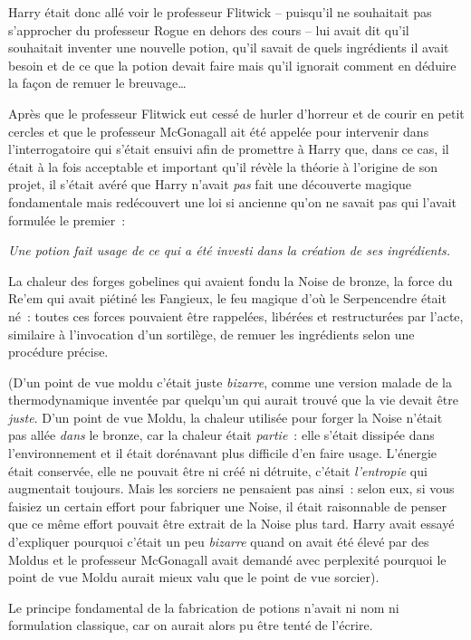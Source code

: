 Harry était donc allé voir le professeur Flitwick -- puisqu'il ne souhaitait pas s'approcher du professeur Rogue en dehors des cours -- lui avait dit qu'il souhaitait inventer une nouvelle potion, qu'il savait de quels ingrédients il avait besoin et de ce que la potion devait faire mais qu'il ignorait comment en déduire la façon de remuer le breuvage…

Après que le professeur Flitwick eut cessé de hurler d'horreur et de courir en petit cercles et que le professeur McGonagall ait été appelée pour intervenir dans l'interrogatoire qui s'était ensuivi afin de promettre à Harry que, dans ce cas, il était à la fois acceptable et important qu'il révèle la théorie à l'origine de son projet, il s'était avéré que Harry n'avait \emph{pas} fait une découverte magique fondamentale mais redécouvert une loi si ancienne qu'on ne savait pas qui l'avait formulée le premier~:

\emph{Une potion fait usage de ce qui a été investi dans la création de ses ingrédients.}

La chaleur des forges gobelines qui avaient fondu la Noise de bronze, la force du Re'em qui avait piétiné les Fangieux, le feu magique d'où le Serpencendre était né~: toutes ces forces pouvaient être rappelées, libérées et restructurées par l'acte, similaire à l'invocation d'un sortilège, de remuer les ingrédients selon une procédure précise.

(D'un point de vue moldu c'était juste \emph{bizarre}, comme une version malade de la thermodynamique inventée par quelqu'un qui aurait trouvé que la vie devait être \emph{juste}.
D'un point de vue Moldu, la chaleur utilisée pour forger la Noise n'était pas allée \emph{dans} le bronze, car la chaleur était \emph{partie}~: elle s'était dissipée dans l'environnement et il était dorénavant plus difficile d'en faire usage.
L'énergie était conservée, elle ne pouvait être ni créé ni détruite, c'était \emph{l'entropie} qui augmentait toujours.
Mais les sorciers ne pensaient pas ainsi~: selon eux, si vous faisiez un certain effort pour fabriquer une Noise, il était raisonnable de penser que ce même effort pouvait être extrait de la Noise plus tard.
Harry avait essayé d'expliquer pourquoi c'était un peu \emph{bizarre} quand on avait été élevé par des Moldus et le professeur McGonagall avait demandé avec perplexité pourquoi le point de vue Moldu aurait mieux valu que le point de vue sorcier).

Le principe fondamental de la fabrication de potions n'avait ni nom ni formulation classique, car on aurait alors pu être tenté de l'écrire.

